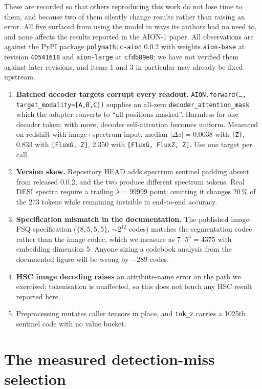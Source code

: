 \documentclass[11pt]{article}
\newcommand{\aion}{AION-1}
\begin{document}
These are recorded so that others reproducing this work do not lose time to them, and because
two of them silently change results rather than raising an error. All five surfaced from using the model in ways its authors
had no need to, and none affects the results reported in the \aion{} paper. All observations are against the PyPI package
\texttt{polymathic-aion} 0.0.2 with weights \texttt{aion-base} at revision
\texttt{40541618} and \texttt{aion-large} at \texttt{cfdb89e8}; we have not verified them
against later revisions, and items 1 and 3 in particular may already be fixed upstream.

\begin{enumerate}\itemsep2pt
\item \textbf{Batched decoder targets corrupt every readout.}
\texttt{AION.forward(\ldots,\,target\_modality=[A,B,C])} supplies an all-zero
\texttt{decoder\_attention\_mask} which the adapter converts to ``all positions masked''.
Harmless for one decoder token; with more, decoder self-attention becomes uniform. Measured on
redshift with image+spectrum input: median $|\Delta z| = 0.0038$ with \texttt{[Z]}, 0.833 with
\texttt{[FluxG, Z]}, 2.350 with \texttt{[FluxG, FluxZ, Z]}. Use one target per call.
\item \textbf{Version skew.} Repository HEAD adds spectrum sentinel padding absent from released
0.0.2, and the two produce different spectrum tokens. Real DESI spectra require a trailing
$\lambda=99999$ point; omitting it changes 20\,\% of the 273 tokens while remaining invisible in
end-to-end accuracy.
\item \textbf{Specification mismatch in the documentation.} The published image-FSQ
specification ($\{8,5,5,5\}$, $\sim2^{12}$ codes) matches the segmentation codec rather than the
image codec, which we measure as $7\cdot5^4=4375$ with embedding dimension 5. Anyone sizing a
codebook analysis from the documented figure will be wrong by \num{-289} codes.
\item \textbf{HSC image decoding raises} an attribute-name error on the path we exercised;
tokenisation is unaffected, so this does not touch any HSC result reported here.
\item Preprocessing mutates caller tensors in place, and \texttt{tok\_z} carries a 1025th
sentinel code with no value bucket.
\end{enumerate}

\section{The measured detection-miss selection}
\label{app:miss}
\end{document}
